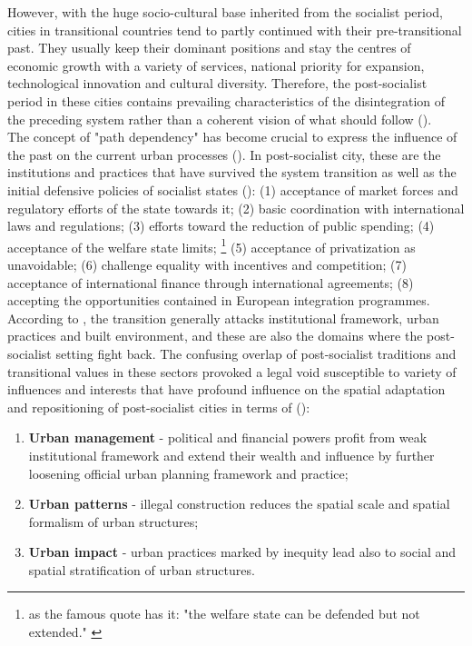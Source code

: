 \documentclass[11pt]{report}
\begin{document}
However, with the huge socio-cultural base inherited from the socialist period, cities in transitional countries tend to partly continued with their pre-transitional past. They usually keep their dominant positions and stay the centres of economic growth  with  a  variety  of  services, national priority for expansion,  technological  innovation  and  cultural  diversity. 
Therefore,  the  post-socialist period in these cities contains prevailing characteristics of the disintegration of the preceding system rather than a coherent vision of what should follow (\href{Stanilov}{\citealt{stanilov_post-socialist_2007}}). 
\\

The concept of "path dependency" has become crucial to express the influence of the past on the current urban processes (\cite{Stark 1992, Thomas 2007, Djordjevic and Dabovic 2009}).
In post-socialist city, these are the institutions and practices that have survived the system transition as well as the initial defensive policies of socialist states (\href{Thomas}{\citealt{thomas_thinking_1998}}): 
(1) acceptance of market  forces and regulatory efforts of the state towards it;
(2) basic coordination with international laws and regulations;
(3) efforts toward the reduction of public spending;
(4) acceptance of the welfare state limits;
\footnote{as the famous quote has it: "the welfare  state can be defended  but  not  extended." \href{Thomas}{\citealt{thomas_thinking_1998}}}
(5) acceptance of  privatization  as unavoidable;
(6) challenge equality with incentives and competition;
(7) acceptance of international finance through international agreements;
(8) accepting the opportunities contained in European  integration programmes.
\\

According to \href{Sykora}{\citealt{sykora_multiple_2012}}, the transition generally attacks institutional framework, urban practices and built environment, and these are also the domains where the post-socialist setting fight back.
The confusing overlap of post-socialist traditions and transitional values in these sectors provoked a legal void susceptible to variety of influences and interests that have profound influence on the spatial adaptation and repositioning of post-socialist cities in terms of (\href{Stanilov}{\citealt{stanilov_post-socialist_2007}}): 

\begin{enumerate}
\item \textbf{Urban management} - political and financial powers profit from weak institutional framework and extend their wealth and influence by further loosening official urban planning framework and practice; 
\item \textbf{Urban patterns} - illegal construction reduces the spatial scale and spatial formalism of urban structures; 
\item \textbf{Urban impact} - urban practices marked by inequity lead also to social and spatial stratification of urban structures.
\end{enumerate}
 
\end{document}
